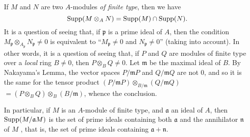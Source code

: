 \begin{env}[1.7.5]
\label{0.1.7.5}
If $M$ and $N$ are two $A$-modules \emph{of finite type}, then we have
\[
  {\mathop{\mathrm{Supp}}\nolimits}(M\otimes_A N)={\mathop{\mathrm{Supp}}\nolimits}(M)\cap{\mathop{\mathrm{Supp}}\nolimits}(N).
\]
It is a question of seeing that, if $\mathfrak{p}$ is a prime ideal of $A$, then the condition $M_\mathfrak{p}\otimes_{A_\mathfrak{p}}N_\mathfrak{p}\neq 0$ is equivalent to ``$M_\mathfrak{p}\neq 0$ and $N_\mathfrak{p}\neq 0$'' (taking  into account).
In other words, it is a question of seeing that, if $P$ and $Q$ are modules of finite type over a \emph{local} ring $B\neq 0$, then $P\otimes_B Q\neq 0$. Let $\mathfrak{m}$ be the maximal ideal of $B$.
By Nakayama's Lemma, the vector spaces $P/\mathfrak{m}P$ and $Q/\mathfrak{m}Q$ are not $0$, and so it is the same for the tensor product $(P/\mathfrak{m}P)\otimes_{B/\mathfrak{m}}(Q/\mathfrak{m}Q)$
$=(P\otimes_B Q)\otimes_B(B/\mathfrak{m})$, whence the conclusion.

In particular, if $M$ is an $A$-module of finite type, and $\mathfrak{a}$ an ideal of $A$, then ${\mathop{\mathrm{Supp}}\nolimits}(M/\mathfrak{a}M)$ is the set of prime ideals containing both $\mathfrak{a}$ and the annihilator $\mathfrak{n}$ of $M$ , that is, the set of prime ideals containing $\mathfrak{a}+\mathfrak{n}$.
\end{env}

